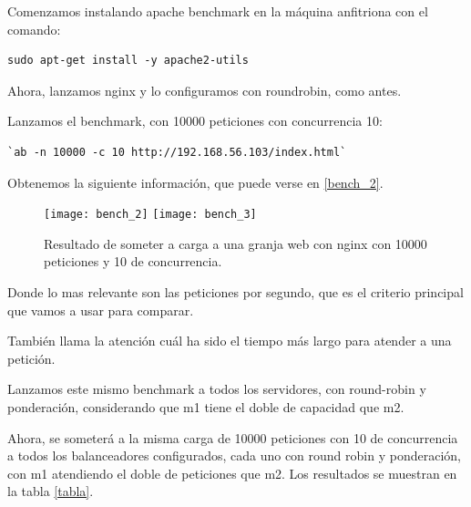 Comenzamos instalando apache benchmark en la máquina anfitriona con el comando:

\begin{verbatim}
sudo apt-get install -y apache2-utils
\end{verbatim}

Ahora, lanzamos nginx y lo configuramos con roundrobin, como antes.

Lanzamos el benchmark, con 10000 peticiones con concurrencia 10:

\begin{verbatim}
`ab -n 10000 -c 10 http://192.168.56.103/index.html`
\end{verbatim}

Obtenemos la siguiente información, que puede verse en \eqref{bench_2}.

\begin{figure}[h!]
\begin{center}
\caption{Resultado de someter a carga a una granja web con nginx con 10000 peticiones y 10 de concurrencia.}
\label{bench_2}
\texttt{[image: bench\_2]}
\texttt{[image: bench\_3]}
\end{center}
\end{figure}

Donde lo mas relevante son las peticiones por segundo, que es el criterio principal que vamos a usar para comparar.

También llama la atención cuál ha sido el tiempo más largo para atender a una petición.

Lanzamos este mismo benchmark a todos los servidores, con round-robin y ponderación, considerando que m1 tiene el doble de capacidad que m2.

Ahora, se someterá a la misma carga de 10000 peticiones con 10 de concurrencia a todos los balanceadores configurados, cada uno con round robin y ponderación, con m1 atendiendo el doble de peticiones que m2. Los resultados se muestran en la tabla \eqref{tabla}.

